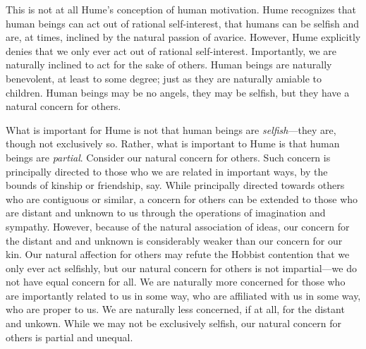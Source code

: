 This is not at all Hume's conception of human motivation. Hume recognizes that human beings can act out of rational self-interest, that humans can be selfish and are, at times, inclined by the natural passion of avarice. However, Hume explicitly denies that we only ever act out of rational self-interest. Importantly, we are naturally inclined to act for the sake of others. Human beings are naturally benevolent, at least to some degree; just as they are naturally amiable to children. Human beings may be no angels, they may be selfish, but they have a natural concern for others.

What is important for Hume is not that human beings are \emph{selfish}---they are, though not exclusively so. Rather, what is important to Hume is that human beings are \emph{partial}. Consider our natural concern for others. Such concern is principally directed to those who we are related in important ways, by the bounds of kinship or friendship, say. While principally directed towards others who are contiguous or similar, a concern for others can be extended to those who are distant and unknown to us through the operations of imagination and sympathy. However, because of the natural association of ideas, our concern for the distant and and unknown is considerably weaker than our concern for our kin. Our natural affection for others may refute the Hobbist contention that we only ever act selfishly, but our natural concern for others is not impartial---we do not have equal concern for all. We are naturally more concerned for those who are importantly related to us in some way, who are affiliated with us in some way, who are proper to us. We are naturally less concerned, if at all, for the distant and unkown. While we may not be exclusively selfish, our natural concern for others is partial and unequal.

% 

